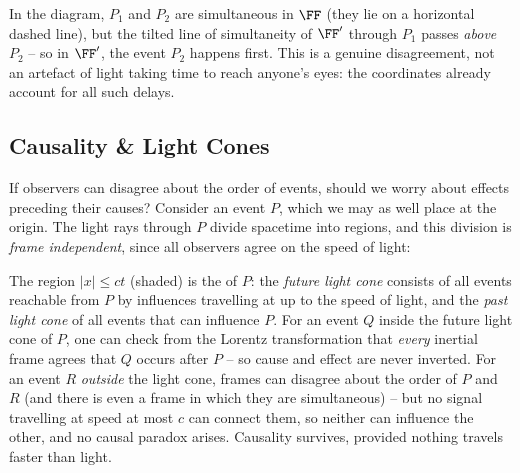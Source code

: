 \documentclass[a4paper]{scrartcl}
\begin{document}
In the diagram, $P_1$ and $P_2$ are simultaneous in $\FF$ (they lie on a horizontal dashed line), but the tilted line of simultaneity of $\FF'$ through $P_1$ passes \emph{above} $P_2$ -- so in $\FF'$, the event $P_2$ happens first. This is a genuine disagreement, not an artefact of light taking time to reach anyone's eyes: the coordinates already account for all such delays.

\subsection{Causality \& Light Cones}

If observers can disagree about the order of events, should we worry about effects preceding their causes? Consider an event $P$, which we may as well place at the origin. The light rays through $P$ divide spacetime into regions, and this division is \emph{frame independent}, since all observers agree on the speed of light:

\begin{center}
\end{center}

The region $|x| \leq ct$ (shaded) is the  of $P$: the \emph{future light cone} consists of all events reachable from $P$ by influences travelling at up to the speed of light, and the \emph{past light cone} of all events that can influence $P$. For an event $Q$ inside the future light cone of $P$, one can check from the Lorentz transformation that \emph{every} inertial frame agrees that $Q$ occurs after $P$ -- so cause and effect are never inverted. For an event $R$ \emph{outside} the light cone, frames can disagree about the order of $P$ and $R$ (and there is even a frame in which they are simultaneous) -- but no signal travelling at speed at most $c$ can connect them, so neither can influence the other, and no causal paradox arises. Causality survives, provided nothing travels faster than light.
\end{document}
